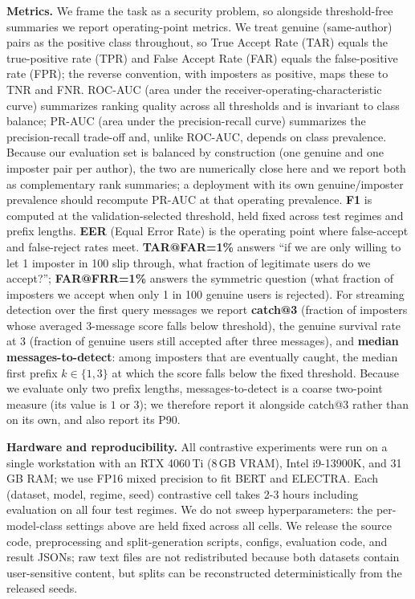 \documentclass[11pt]{article}
\begin{document}
\noindent\textbf{Metrics.} We frame the task as a security problem, so alongside threshold-free summaries we report operating-point metrics. We treat genuine (same-author) pairs as the positive class throughout, so True Accept Rate (TAR) equals the true-positive rate (TPR) and False Accept Rate (FAR) equals the false-positive rate (FPR); the reverse convention, with imposters as positive, maps these to TNR and FNR. ROC-AUC (area under the receiver-operating-characteristic curve) summarizes ranking quality across all thresholds and is invariant to class balance; PR-AUC (area under the precision-recall curve) summarizes the precision-recall trade-off and, unlike ROC-AUC, depends on class prevalence. Because our evaluation set is balanced by construction (one genuine and one imposter pair per author), the two are numerically close here and we report both as complementary rank summaries; a deployment with its own genuine/imposter prevalence should recompute PR-AUC at that operating prevalence. \textbf{F1} is computed at the validation-selected threshold, held fixed across test regimes and prefix lengths. \textbf{EER} (Equal Error Rate) is the operating point where false-accept and false-reject rates meet. \textbf{TAR@FAR=1\%} answers ``if we are only willing to let 1 imposter in 100 slip through, what fraction of legitimate users do we accept?''; \textbf{FAR@FRR=1\%} answers the symmetric question (what fraction of imposters we accept when only 1 in 100 genuine users is rejected). For streaming detection over the first query messages we report \textbf{catch@3} (fraction of imposters whose averaged 3-message score falls below threshold), the genuine survival rate at 3 (fraction of genuine users still accepted after three messages), and \textbf{median messages-to-detect}: among imposters that are eventually caught, the median first prefix $k\in\{1,3\}$ at which the score falls below the fixed threshold. Because we evaluate only two prefix lengths, messages-to-detect is a coarse two-point measure (its value is $1$ or $3$); we therefore report it alongside catch@3 rather than on its own, and also report its P90.

\noindent\textbf{Hardware and reproducibility.} All contrastive experiments were run on a single workstation with an RTX 4060\,Ti (8\,GB VRAM), Intel i9-13900K, and 31\,GB RAM; we use FP16 mixed precision to fit BERT and ELECTRA. Each (dataset, model, regime, seed) contrastive cell takes 2-3 hours including evaluation on all four test regimes. We do not sweep hyperparameters: the per-model-class settings above are held fixed across all cells. We release the source code, preprocessing and split-generation scripts, configs, evaluation code, and result JSONs; raw text files are not redistributed because both datasets contain user-sensitive content, but splits can be reconstructed deterministically from the released seeds.
\end{document}
